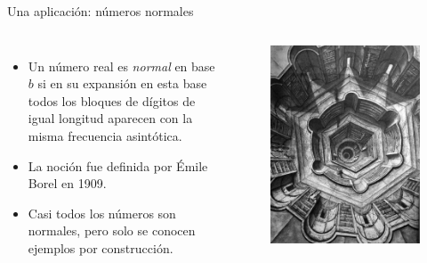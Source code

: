\documentclass[spanish,xcolor={table}]{beamer}
\begin{document}
\begin{frame}{Una aplicación: números normales}

  \begin{columns}
  
    \begin{itemize}
      \item Un número real es \emph{normal} en base $b$ si en su expansión en esta base  todos los bloques de dígitos de igual longitud aparecen con la misma frecuencia asintótica.
      \item La noción fue definida por Émile Borel en 1909.
      \item Casi todos los números son normales, pero solo se conocen ejemplos por construcción.
    \end{itemize}

    \begin{figure}
      \includegraphics[width=.9\textwidth]{babel.jpg}
    \end{figure}
  \end{columns}

\end{frame}
\end{document}
